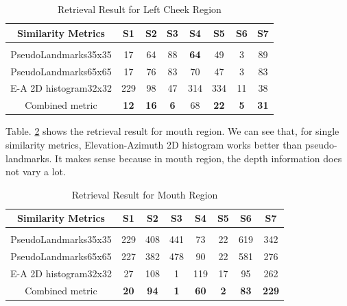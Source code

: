 \documentclass[annual]{acmsiggraph}
\begin{document}
\begin{table}[!hbp]
\caption{Retrieval Result for Left Cheek Region}
\label{similaritycheek}
\begin{center}
\begin{tabular}{cccccccc}
\multicolumn{1}{c}{\bf{Similarity Metrics}} &\multicolumn{1}{c}{S1}  &\multicolumn{1}{c}{S2} &\multicolumn{1}{c}{S3} &\multicolumn{1}{c}{S4}  &\multicolumn{1}{c}{S5} &\multicolumn{1}{c}{S6}   
&\multicolumn{1}{c}{S7} 
\\ \hline \\
PseudoLandmarks35x35 &17 &64 &88 &\bf{64} &49 &3 &89\\
PseudoLandmarks65x65 &17 &76 &83 &70 &47 &3 &83\\
E-A 2D histogram32x32    &229  &98 &47 &314 &334 &11 &38\\
Combined metric &\bf{12} &\bf{16} &\bf{6} &68 &\bf{22} &\bf{5} &\bf{31}\\
\end{tabular}
\end{center}
\end{table}

Table. \ref{similaritymouth} shows the retrieval result for mouth region. We can see that, for single similarity metrics, Elevation-Azimuth 2D histogram works better than pseudo-landmarks. It makes sense because in mouth region, the depth information does not vary a lot.

\begin{table}[!hbp]
\caption{Retrieval Result for Mouth Region}
\label{similaritymouth}
\begin{center}
\begin{tabular}{cccccccc}
\multicolumn{1}{c}{\bf{Similarity Metrics}} &\multicolumn{1}{c}{S1}  &\multicolumn{1}{c}{S2} &\multicolumn{1}{c}{S3} &\multicolumn{1}{c}{S4}  &\multicolumn{1}{c}{S5} &\multicolumn{1}{c}{S6}   
&\multicolumn{1}{c}{S7} 
\\ \hline \\
PseudoLandmarks35x35 &229 &408 &441 &73 &22 &619 &342\\
PseudoLandmarks65x65 &227 &382 &478 &90 &22 &581 &276\\
E-A 2D histogram32x32    &27  &108 &1 &119 &17 &95 &262\\
Combined metric &\bf{20}  &\bf{94} &\bf{1} &\bf{60} &\bf{2} &\bf{83} &\bf{229}\\
\end{tabular}
\end{center}
\end{table}
\end{document}
